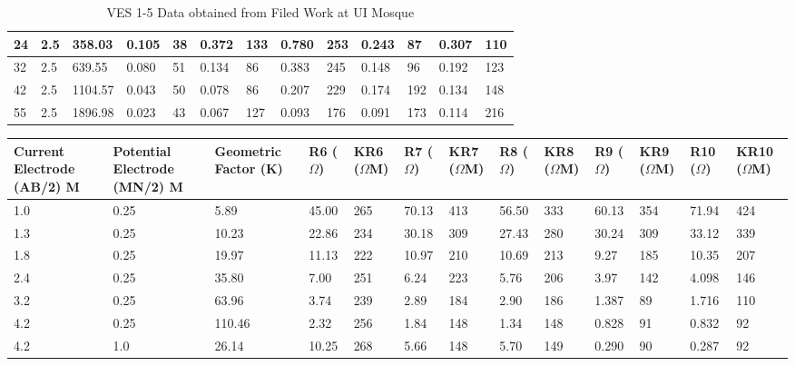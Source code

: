 \documentclass[12pt,a4paper]{report}
\begin{document}
\begin{table}[h!]
\begin{adjustbox}{max width=\textwidth}
\begin{tabular}{|p{2.5cm}|p{2.5cm}|p{2.5cm}|p{1.5cm}|p{1.8cm}|p{1.5cm}|p{1.8cm}|p{1.5cm}|p{1.8cm}|p{1.5cm}|p{1.8cm}|p{1.5cm}|p{1.8cm}|}
    24 & 2.5 & 358.03 & 0.105 & 38 & 0.372 & 133 & 0.780 & 253 & 0.243 & 87 & 0.307 & 110 \\ \hline
    32 & 2.5 & 639.55 & 0.080 & 51 & 0.134 & 86 & 0.383 & 245 & 0.148 & 96 & 0.192 & 123 \\ \hline
    42 & 2.5 & 1104.57 & 0.043 & 50 & 0.078 & 86 & 0.207 & 229 & 0.174 & 192 & 0.134 & 148 \\ \hline
    55 & 2.5 & 1896.98 & 0.023 & 43 & 0.067 & 127 & 0.093 & 176 & 0.091 & 173 & 0.114 & 216 \\ \hline
    \end{tabular}
    \end{adjustbox}
    \caption{VES 1-5 Data obtained from Filed Work at UI Mosque}
    \label{tab:ui_ves-1-5}
\end{table}

\begin{table}[h!]
    \centering
    \begin{adjustbox}{max width=\textwidth}
    \renewcommand{\arraystretch}{1.5}
    \begin{tabular}{|p{2.5cm}|p{2.5cm}|p{2.5cm}|p{1.5cm}|p{1.8cm}|p{1.5cm}|p{1.8cm}|p{1.5cm}|p{1.8cm}|p{1.5cm}|p{1.8cm}|p{1.5cm}|p{1.8cm}|}
    \hline
    \textbf{Current Electrode (AB/2) M} & 
    \textbf{Potential Electrode (MN/2) M} & 
    \textbf{Geometric Factor (K)} & 
    \textbf{R6 ($\Omega$)} & 
    \textbf{KR6 ($\Omega$M)} & 
    \textbf{R7 ($\Omega$)} & 
    \textbf{KR7 ($\Omega$M)} & 
    \textbf{R8 ($\Omega$)} & 
    \textbf{KR8 ($\Omega$M)} & 
    \textbf{R9 ($\Omega$)} & 
    \textbf{KR9 ($\Omega$M)} & 
    \textbf{R10 ($\Omega$)} & 
    \textbf{KR10 ($\Omega$M)} \\ 
    \hline
    1.0 & 0.25 & 5.89 & 45.00 & 265 & 70.13 & 413 & 56.50 & 333 & 60.13 & 354 & 71.94 & 424 \\ \hline
    1.3 & 0.25 & 10.23 & 22.86 & 234 & 30.18 & 309 & 27.43 & 280 & 30.24 & 309 & 33.12 & 339 \\ \hline
    1.8 & 0.25 & 19.97 & 11.13 & 222 & 10.97 & 210 & 10.69 & 213 & 9.27 & 185 & 10.35 & 207 \\ \hline
    2.4 & 0.25 & 35.80 & 7.00 & 251 & 6.24 & 223 & 5.76 & 206 & 3.97 & 142 & 4.098 & 146 \\ \hline
    3.2 & 0.25 & 63.96 & 3.74 & 239 & 2.89 & 184 & 2.90 & 186 & 1.387 & 89 & 1.716 & 110 \\ \hline
    4.2 & 0.25 & 110.46 & 2.32 & 256 & 1.84 & 148 & 1.34 & 148 & 0.828 & 91 & 0.832 & 92 \\ \hline
    4.2 & 1.0 & 26.14 & 10.25 & 268 & 5.66 & 148 & 5.70 & 149 & 0.290 & 90 & 0.287 & 92 \\ \hline

\end{tabular}
\end{adjustbox}
\end{table}
\end{document}
